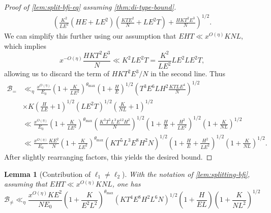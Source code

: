 \documentclass[reqno,11pt]{amsart}
\newtheorem{lemma}[theorem]{Lemma}
\theoremstyle{definition}
\theoremstyle{remark}
\numberwithin{equation}{section}
\newcommand{\mB}{\mathcal{B}}
\begin{document}
\begin{proof}[Proof of \cref{lem:split-bfi-eq} assuming \cref{thm:di-type-bound}]
\[\begin{aligned}
    \left(\frac{K^2}{L E^2} \left(HE + L E^2\right)\left(\frac{KTE^2}{N} + L E^2 T\right) + \frac{HKT^2E^3}{N} \right)^{1/2}.
\end{aligned}
\]
We can simplify this further using our assumption that $EHT \ll x^{O(\eta)} KNL$, which implies
\[
    x^{-O(\eta)} \frac{HKT^2E^3}{N} \ll K^2 L E^2 T = \frac{K^2}{LE^2} LE^2 LE^2T,
\]
allowing us to discard the term of $HKT^2E^3/N$ in the second line. Thus
\[
\begin{aligned}
    \mB_= &\ll_\eta
    \frac{x^{O(\eta)}}{E_0}
    \left(1 + \frac{K}{LE^2}\right)^{\theta_{\max}}
    \left(1 + \frac{H}{E}\right)^{1/2}
    \left(T^3 E^6 L H^2 \frac{KTLE^4}{N} \right)^{1/2}
    \\
    &\times
    K \left(\frac{H}{LE} + 1\right)^{1/2} \left(LE^2T\right)^{1/2} \left(\frac{K}{NL} + 1 \right)^{1/2}
    \\
    &\ll 
    \frac{x^{O(\eta)}}{E_0} 
    \left(1 + \frac{K}{LE^2}\right)^{\theta_{\max}}
    \left(\frac{K^3T^5L^3E^{12}H^2}{N} \right)^{1/2}
    \left(1 + \frac{H}{E} + \frac{H^2}{LE^2}\right)^{1/2} \left(1 + \frac{K}{NL} \right)^{1/2}
    \\
    &\ll 
    \frac{x^{O(\eta)}}{E_0} \frac{KE^2}{N}
    \left(1 + \frac{K}{LE^2}\right)^{\theta_{\max}}
    \left(KT^5L^3E^8H^2 N\right)^{1/2}
    \left(1 + \frac{H}{E} + \frac{H^2}{LE^2}\right)^{1/2} \left(1 + \frac{K}{NL} \right)^{1/2}.
\end{aligned}
\]
After slightly rearranging factors, this yields the desired bound.
\end{proof}


\begin{lemma}[Contribution of $\ell_1 \neq \ell_2$] \label{lem:split-bfi-neq}
With the notation of \cref{lem:splitting-bfi}, assuming that $EHT \ll x^{O(\eta)} KNL$, one has
\[
    \mB_{\neq} \ll_\eta 
    \frac{x^{O(\eta)} K E^2}{NE_0} 
    \left(1 + \frac{K}{E^2 L^2}\right)^{\theta_{\max}}
    \left(K T^4 E^8 H^2 L^6 N\right)^{1/2}
    \left(1 + \frac{H}{EL}\right) \left(1 + \frac{K}{NL^2}\right)^{1/2}
\]
\end{lemma}
\end{document}

